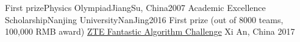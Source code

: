 \documentclass[11pt, a4paper]{awesome-cv}
\begin{document}
%
\begin{cvhonors}
    \cvhonor
    {First prize}{Physics Olympiad}{JiangSu, China}{2007}
    \cvhonor
    {Academic Excellence Scholarship}{Nanjing University}{NanJing}{2016}
    \cvhonor
    {First prize (out of 8000 teams, 100,000 RMB award)} %
    {\href{http://www.iqiyi.com/w\_19rto3v4h1.html}{ZTE Fantastic Algorithm Challenge}} %
    {Xi An, China} %
    {2017} %
\end{cvhonors}
\end{document}
